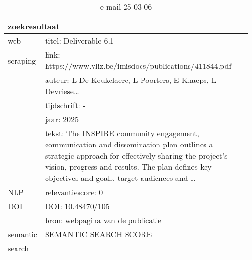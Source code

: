 \begin{table}[h!]
    \caption{e-mail 25-03-06}
    \centering
    \begin{tabularx}{\textwidth}{|p{4cm}|X|} 
        \hline
        \multicolumn{2}{|X|}{\textbf{zoekresultaat}} \\
        \hline
        web &titel: Deliverable 6.1\\
        scraping&link: https://www.vliz.be/imisdocs/publications/411844.pdf\\
        &auteur: L De Keukelaere, L Poorters, E Knaeps, L Devriese…\\
        &tijdschrift: -\\
        &jaar: 2025\\
        &tekst: The INSPIRE community engagement, communication and dissemination plan outlines a strategic approach for effectively sharing the project’s vision, progress and results. The plan defines key objectives and goals, target audiences and …\\
        \hline
        NLP&relevantiescore: 0\\
        \hline
        DOI&DOI: 10.48470/105\\
        &bron: webpagina van de publicatie\\
        \hline
        semantic&SEMANTIC SEARCH SCORE\\
        search&\\
        \hline
    \end{tabularx}
    \label{table:email20250306}
\end{table}
